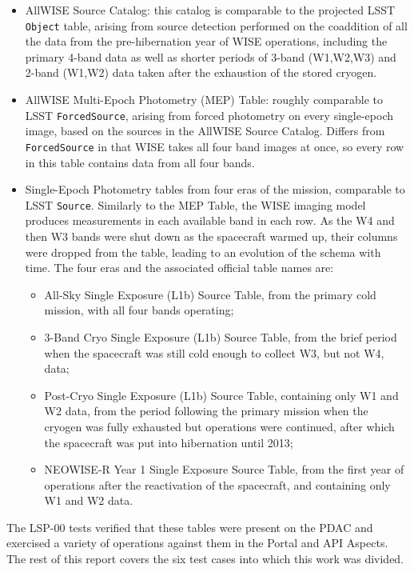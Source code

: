 \documentclass[DM,lsstdraft,STR,toc]{lsstdoc}
\begin{document}
\begin{itemize}

\item AllWISE Source Catalog: this catalog is comparable to the projected LSST \texttt{Object} table, arising from source detection performed on the coaddition of all the data from the pre-hibernation year of WISE operations, including the primary 4-band data as well as shorter periods of 3-band (W1,W2,W3) and 2-band (W1,W2) data taken after the exhaustion of the stored cryogen.

\item AllWISE Multi-Epoch Photometry (MEP) Table: roughly comparable to LSST \texttt{ForcedSource}, arising from forced photometry on every single-epoch image, based on the sources in the AllWISE Source Catalog.  
Differs from \texttt{ForcedSource} in that WISE takes all four band images at once, so every row in this table contains data from all four bands.

\item Single-Epoch Photometry tables from four eras of the mission, comparable to LSST \texttt{Source}.  
Similarly to the MEP Table, the WISE imaging model produces measurements in each available band in each row.  
As the W4 and then W3 bands were shut down as the spacecraft warmed up, their columns were dropped from the table, leading to an evolution of the schema with time.  
The four eras and the associated official table names are:
  \begin{itemize}
  \item All-Sky Single Exposure (L1b) Source Table, from the primary cold mission, with all four bands operating;
  \item 3-Band Cryo Single Exposure (L1b) Source Table, from the brief period when the spacecraft was still cold enough to collect W3, but not W4, data;
  \item Post-Cryo Single Exposure (L1b) Source Table, containing only W1 and W2 data, from the period following the primary mission when the cryogen was fully exhausted but operations were continued, after which the spacecraft was put into hibernation until 2013;
  \item NEOWISE-R Year 1 Single Exposure Source Table, from the first year of operations after the reactivation of the spacecraft, and containing only W1 and W2 data.
  \end{itemize}
\end{itemize}

The LSP-00 tests verified that these tables were present on the PDAC and exercised a variety of operations against them in the Portal and API Aspects.
The rest of this report covers the six test cases into which this work was divided.
\end{document}
